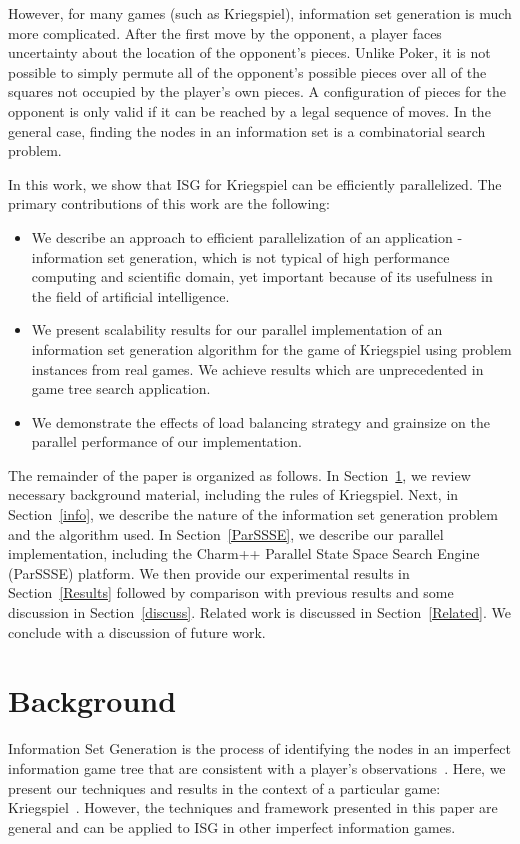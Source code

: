\documentclass[10pt, conference, compsocconf]{IEEEtran}
\begin{document}
However, for many games (such as Kriegspiel), information set generation is much more complicated.
After the first move by the opponent, a player faces uncertainty about the
location of the opponent's pieces.  Unlike Poker, it is not possible to simply
permute all of the opponent's possible pieces over all of the squares not
occupied by the player's own pieces.  A configuration of pieces for the
opponent is only valid if it can be reached by a legal sequence of moves.  In
the general case, finding the nodes in an information set is a combinatorial
search problem.

In this work, we show that ISG for Kriegspiel can be efficiently parallelized.
The primary contributions of this work are the following:
\begin{itemize}
\item
 We describe an
approach to efficient parallelization of an application - information set generation,  which is not typical of
high performance computing and scientific domain, yet important because of its usefulness in the field of artificial intelligence.
\item
 We present scalability results for our
parallel implementation of an information set generation algorithm for the game
of Kriegspiel using problem instances from real games. We achieve results which are unprecedented in game tree search application. 
\item
We demonstrate
the effects of load balancing strategy and grainsize on the parallel performance of our implementation. 
\end{itemize}

The remainder of the paper is organized as follows.  In Section~\ref{Kriegspiel}, we review
necessary background material, including the rules of Kriegspiel. Next, in
Section~\ref{info}, we describe the nature of the information set generation
problem and the algorithm used.  In Section~\ref{ParSSSE}, we describe our
parallel implementation, including the {\sc Charm++} Parallel State Space
Search Engine (ParSSSE) platform.  We then provide our experimental results in
Section~\ref{Results} followed by comparison with previous results and some discussion in Section~\ref{discuss}.  Related work is discussed in Section~\ref{Related}.  We
conclude with a discussion of future work.


\section{Background}\label{Kriegspiel}
Information Set Generation is the process of identifying the nodes in an
imperfect information game tree that are consistent with a player's
observations~\cite{richards12information}. Here, we present our techniques and
results in the context of a particular game: Kriegspiel~\cite{li94chess}.
However, the techniques and framework presented in this paper are general and
can be applied to ISG in other imperfect information games.
\end{document}

